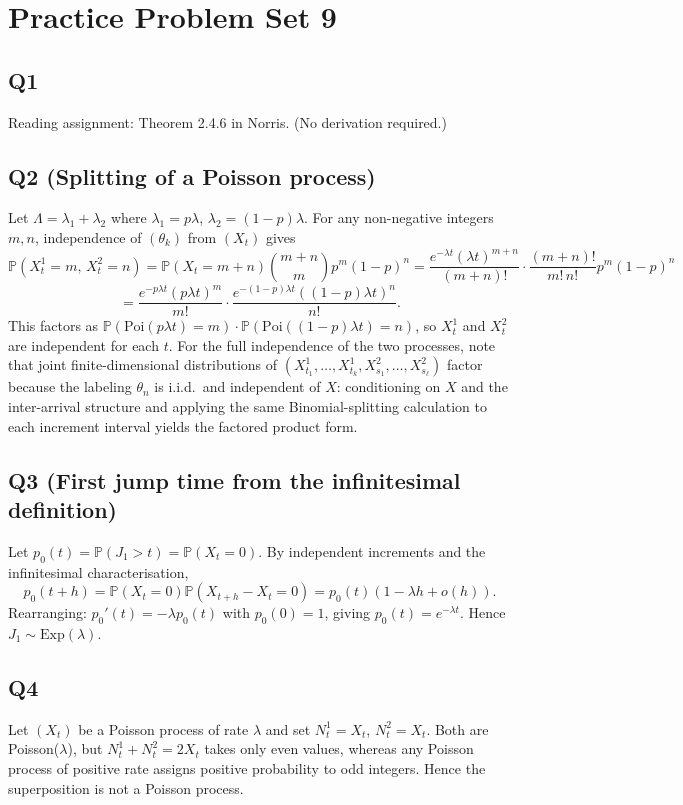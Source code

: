 \documentclass[11pt]{article}
\newcommand{\PP}{\mathbb{P}}
\newcommand{\1}{\mathbf{1}}
\begin{document}
\section{Practice Problem Set 9}

\subsection*{Q1}
Reading assignment: Theorem 2.4.6 in Norris. (No derivation required.)

\subsection*{Q2 (Splitting of a Poisson process)}
Let $\Lambda=\lambda_1+\lambda_2$ where $\lambda_1=p\lambda$, $\lambda_2=(1-p)\lambda$.
For any non-negative integers $m,n$, independence of $(\theta_k)$ from $(X_t)$ gives
\[
\PP(X^1_t=m,\,X^2_t=n)
=\PP(X_t=m{+}n)\binom{m+n}{m}p^m(1-p)^n
=\frac{e^{-\lambda t}(\lambda t)^{m+n}}{(m+n)!}\cdot\frac{(m+n)!}{m!\,n!}p^m(1-p)^n
\]
\[
=\frac{e^{-p\lambda t}(p\lambda t)^m}{m!}\cdot\frac{e^{-(1-p)\lambda t}((1-p)\lambda t)^n}{n!}.
\]
This factors as $\PP(\mathrm{Poi}(p\lambda t)=m)\cdot\PP(\mathrm{Poi}((1-p)\lambda t)=n)$, so $X^1_t$ and $X^2_t$ are independent for each $t$.
For the full independence of the two processes, note that joint finite-dimensional distributions of $(X^1_{t_1},\ldots,X^1_{t_k},X^2_{s_1},\ldots,X^2_{s_\ell})$ factor because the labeling $\theta_n$ is i.i.d.\ and independent of $X$: conditioning on $X$ and the inter-arrival structure and applying the same Binomial-splitting calculation to each increment interval yields the factored product form.

\subsection*{Q3 (First jump time from the infinitesimal definition)}
Let $p_0(t)=\PP(J_1>t)=\PP(X_t=0)$.  By independent increments and the infinitesimal characterisation,
\[
p_0(t+h)=\PP(X_t=0)\PP(X_{t+h}-X_t=0)=p_0(t)(1-\lambda h+o(h)).
\]
Rearranging: $p_0'(t)=-\lambda p_0(t)$ with $p_0(0)=1$, giving $p_0(t)=e^{-\lambda t}$.
Hence $J_1\sim\mathrm{Exp}(\lambda)$.

\subsection*{Q4}
Let $(X_t)$ be a Poisson process of rate $\lambda$ and set $N^1_t=X_t$, $N^2_t=X_t$.  Both are Poisson($\lambda$), but $N^1_t+N^2_t=2X_t$ takes only even values, whereas any Poisson process of positive rate assigns positive probability to odd integers.  Hence the superposition is not a Poisson process.
\end{document}
